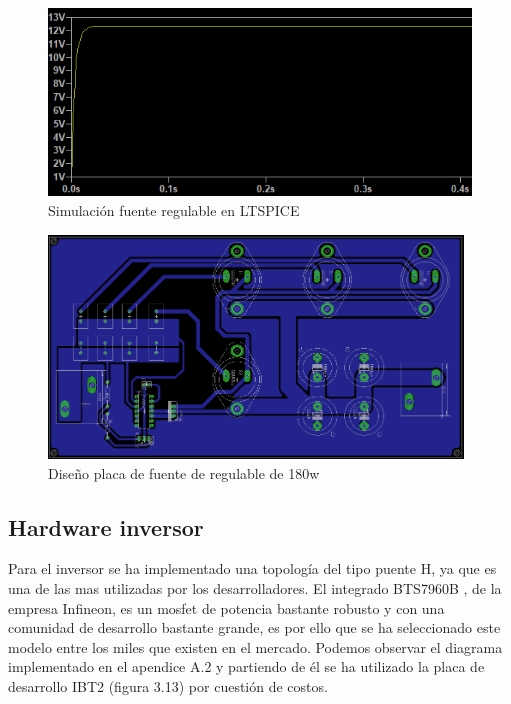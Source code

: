 \begin{figure}[H]
\centering
\includegraphics[width=12cm]{Capitulo3/figs/12v.png}
\caption{Simulación fuente regulable en LTSPICE}
\end{figure}

\begin{figure}[H]
\centering
\includegraphics[width=11cm]{Capitulo3/figs/pcb.png}
\caption{Diseño placa de fuente de regulable de 180w}
\end{figure}





\newpage

\subsection{Hardware inversor}

Para el inversor se ha implementado una topología del tipo puente H, ya que es una de las mas utilizadas por los desarrolladores. El integrado BTS7960B \cite{databts}, de la empresa Infineon, es un mosfet de potencia bastante robusto y con una comunidad de desarrollo bastante grande, es por ello que se ha seleccionado este modelo entre los miles que existen en el mercado. Podemos observar el diagrama implementado en el apendice A.2 \cite{ibt} y partiendo de él se ha utilizado la placa de desarrollo IBT2 (figura 3.13) por cuestión de costos. \\

